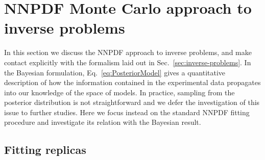 \section{NNPDF Monte Carlo approach to inverse problems}
\label{sec:closure-test}

In this section we discuss the NNPDF approach to inverse problems, and make
contact explicitly with the formalism laid out in
Sec.~\ref{sec:inverse-problems}. In the Bayesian formulation,
Eq.~\eqref{eq:PosteriorModel} gives a quantitative description of how the
information contained in the experimental data propagates into our knowledge of
the space of models. In practice, sampling from the posterior distribution is
not straightforward and we defer the investigation of this issue to further
studies. Here we focus instead on the standard NNPDF fitting procedure and
investigate its relation with the Bayesian result. 

\subsection{Fitting replicas}
\label{sec:fit-reps}

